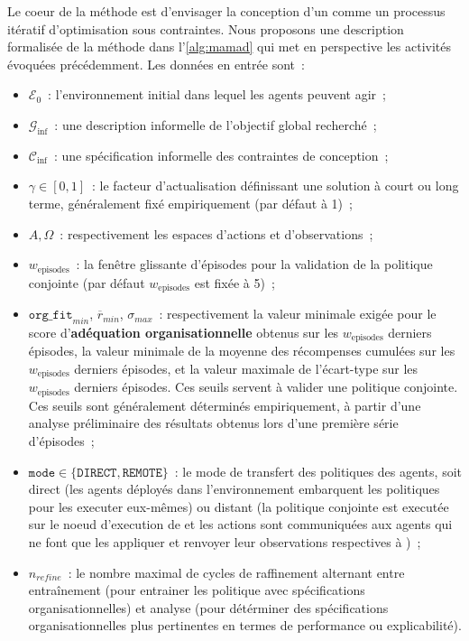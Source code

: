 Le coeur de la méthode  est d'envisager la conception d'un  comme un processus itératif d'optimisation sous contraintes. Nous proposons une description formalisée de la méthode  dans l'\autoref{alg:mamad} qui met en perspective les activités évoquées précédemment. Les données en entrée sont~:
\begin{itemize}
  \item $\mathcal{E}_0$~: l'environnement initial dans lequel les agents peuvent agir~;
  \item $\mathcal{G}_{\text{inf}}$~: une description informelle de l'objectif global recherché~;
  \item $\mathcal{C}_{\text{inf}}$~: une spécification informelle des contraintes de conception~;
  \item $\gamma \in [0,1]$~: le facteur d'actualisation définissant une solution à court ou long terme, généralement fixé empiriquement (par défaut à 1)~;
  \item $A, \Omega$~: respectivement les espaces d'actions et d'observations~;
  \item $w_{\text{episodes}}$~: la fenêtre glissante d'épisodes pour la validation de la politique conjointe (par défaut $w_{\text{episodes}}$ est fixée à 5)~;
  \item $\texttt{org\_fit}_{min}$, $\overline{r}_{min}$, $\sigma_{max}$~: respectivement la valeur minimale exigée pour le score d'\textbf{adéquation organisationnelle} obtenus sur les $w_{\text{episodes}}$ derniers épisodes, la valeur minimale de la moyenne des récompenses cumulées sur les $w_{\text{episodes}}$ derniers épisodes, et la valeur maximale de l'écart-type sur les $w_{\text{episodes}}$ derniers épisodes. Ces seuils servent à valider une politique conjointe. Ces seuils sont généralement déterminés empiriquement, à partir d'une analyse préliminaire des résultats obtenus lors d'une première série d'épisodes~;
  \item $\texttt{mode} \in \{\texttt{DIRECT}, \texttt{REMOTE}\}$~: le mode de transfert des politiques des agents, soit direct (les agents déployés dans l'environnement embarquent les politiques pour les executer eux-mêmes) ou distant (la politique conjointe est executée sur le noeud d'execution de  et les actions sont communiquées aux agents qui ne font que les appliquer et renvoyer leur observations respectives à )~;
  \item $n_{refine}$~: le nombre maximal de cycles de raffinement alternant entre entraînement (pour entrainer les politique avec spécifications organisationnelles) et analyse (pour détérminer des spécifications organisationnelles plus pertinentes en termes de performance ou explicabilité).
\end{itemize}

